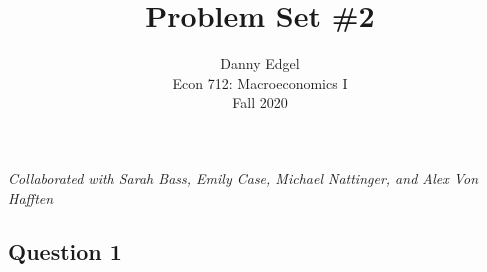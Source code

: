 \documentclass{article}
\begin{document}
\title{	Problem Set \#2 }
\author{ 	Danny Edgel 					\\ 
			Econ 712: Macroeconomics I		\\
			Fall 2020						\\
		}
\maketitle\thispagestyle{empty}


\noindent\textit{Collaborated with Sarah Bass, Emily Case, Michael Nattinger, and Alex Von Hafften}

\subsection*{Question 1}
\end{document}
